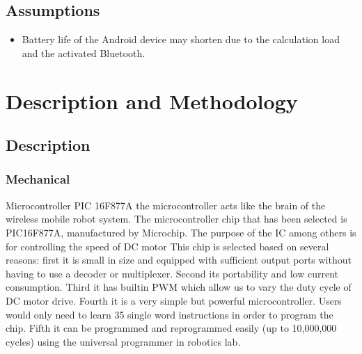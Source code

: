 \subsection{Assumptions}
\begin{itemize}
	\item Battery life of the Android device may shorten due to the calculation load and the activated Bluetooth.
\end{itemize}

\section{Description and Methodology}
\subsection{Description}
\subsubsection{Mechanical}
Microcontroller PIC 16F877A the microcontroller acts like the brain of the wireless mobile robot system. The microcontroller chip that has been selected is PIC16F877A, manufactured by Microchip. The purpose of the IC among others is for controlling the speed of DC motor This chip is selected based on several reasons: first it is small in size and equipped with sufficient output ports without having to use a decoder or multiplexer. Second its portability and low current consumption. Third it has built\-in PWM which allow us to vary the duty cycle of DC motor drive. Fourth it is a very simple but powerful microcontroller. Users would only need to learn 35 single word instructions in order to program the chip. Fifth it can be programmed and reprogrammed easily (up to 10,000,000 cycles) using the universal programmer in robotics lab.
